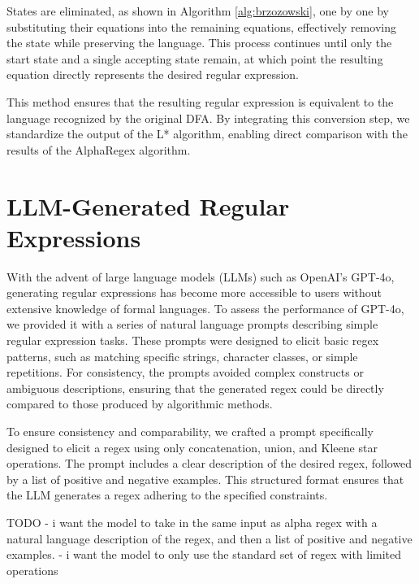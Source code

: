 \indent\indent States are eliminated, as shown in Algorithm \ref{alg:brzozowski}, one by one by substituting their equations into the remaining equations, effectively removing the state while preserving the language. This process continues until only the start state and a single accepting state remain, at which point the resulting equation directly represents the desired regular expression.

\indent\indent This method ensures that the resulting regular expression is equivalent to the language recognized by the original DFA. By integrating this conversion step, we standardize the output of the L* algorithm, enabling direct comparison with the results of the AlphaRegex algorithm. \cite{brzozowski_1964_derivatives}

\vspace{-0.4em}
\section{LLM-Generated Regular Expressions}
\vspace{-0.4em}

\indent\indent With the advent of large language models (LLMs) such as OpenAI's GPT-4o, generating regular expressions has become more accessible to users without extensive knowledge of formal languages. To assess the performance of GPT-4o, we provided it with a series of natural language prompts describing simple regular expression tasks. These prompts were designed to elicit basic regex patterns, such as matching specific strings, character classes, or simple repetitions. For consistency, the prompts avoided complex constructs or ambiguous descriptions, ensuring that the generated regex could be directly compared to those produced by algorithmic methods.

\indent\indent To ensure consistency and comparability, we crafted a prompt specifically designed to elicit a regex using only concatenation, union, and Kleene star operations. The prompt includes a clear description of the desired regex, followed by a list of positive and negative examples. This structured format ensures that the LLM generates a regex adhering to the specified constraints. 


TODO
- i want the model to take in the same input as alpha regex with a natural language description of the regex, and then a list of positive and negative examples.
- i want the model to only use the standard set of regex with limited operations

